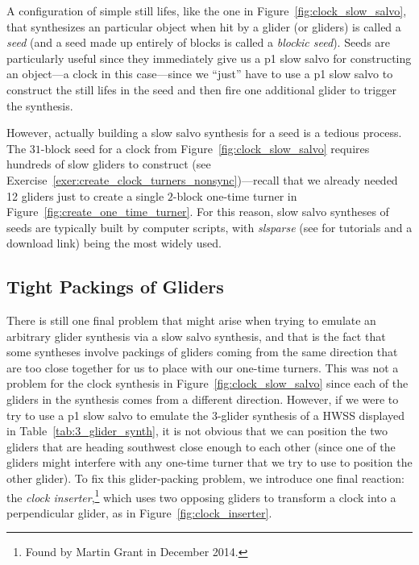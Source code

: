 A configuration of simple still lifes, like the one in Figure~\ref{fig:clock_slow_salvo}, that synthesizes an particular object when hit by a glider (or gliders) is called a \emph{seed} (and a seed made up entirely of blocks is called a \emph{blockic seed}). Seeds are particularly useful since they immediately give us a p1 slow salvo for constructing an object---a clock in this case---since we ``just'' have to use a p1 slow salvo to construct the still lifes in the seed and then fire one additional glider to trigger the synthesis.

However, actually building a slow salvo synthesis for a seed is a tedious process. The $31$-block seed for a clock from Figure~\ref{fig:clock_slow_salvo} requires hundreds of slow gliders to construct (see Exercise~\ref{exer:create_clock_turners_nonsync})---recall that we already needed 12 gliders just to create a single $2$-block one-time turner in Figure~\ref{fig:create_one_time_turner}. For this reason, slow salvo syntheses of seeds are typically built by computer scripts, with \emph{slsparse} (see  for tutorials and a download link) being the most widely used.%


\subsection{Tight Packings of Gliders}\label{sec:slow_salvo_tight}

There is still one final problem that might arise when trying to emulate an arbitrary glider synthesis via a slow salvo synthesis, and that is the fact that some syntheses involve packings of gliders coming from the same direction that are too close together for us to place with our one-time turners. This was not a problem for the clock synthesis in Figure~\ref{fig:clock_slow_salvo} since each of the gliders in the synthesis comes from a different direction. However, if we were to try to use a p1 slow salvo to emulate the 3-glider synthesis of a HWSS displayed in Table~\ref{tab:3_glider_synth}, it is not obvious that we can position the two gliders that are heading southwest close enough to each other (since one of the gliders might interfere with any one-time turner that we try to use to position the other glider). To fix this glider-packing problem, we introduce one final reaction: the \emph{clock inserter},\footnote{Found by Martin Grant in December 2014.} which uses two opposing gliders to transform a clock into a perpendicular glider, as in Figure~\ref{fig:clock_inserter}.


